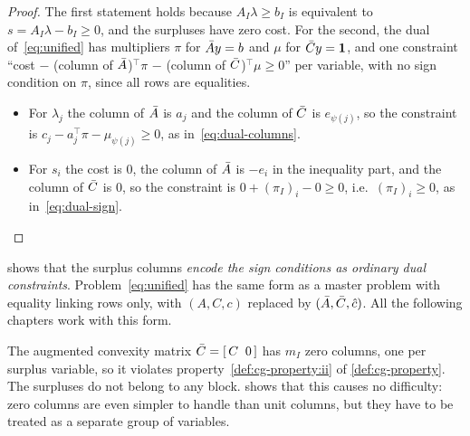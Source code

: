 \begin{proof}
The first statement holds because $A_I\lambda\ge b_I$ is equivalent to
$s = A_I\lambda - b_I\ge0$, and the surpluses have zero cost. For the second, the dual
of~\eqref{eq:unified} has multipliers $\pi$ for $\bar{A} y = b$ and $\mu$ for $\bar{C} y = \mathbf{1}$,
and one constraint ``cost $-$ (column of $\bar{A}$)$^\top\pi$ $-$ (column of $\bar{C}$)$^\top\mu\ge0$''
per variable, with no sign condition on $\pi$, since all rows are equalities.
\begin{itemize}
    \item For $\lambda_j$ the column of $\bar{A}$ is $a_j$ and the column of $\bar{C}$ is
          $e_{\psi(j)}$, so the constraint is $c_j - a_j^\top\pi - \mu_{\psi(j)}\ge0$, as
          in~\eqref{eq:dual-columns}.
    \item For $s_i$ the cost is $0$, the column of $\bar{A}$ is $-e_i$ in the inequality part, and
          the column of $\bar{C}$ is $0$, so the constraint is $0 + (\pi_I)_i - 0\ge0$, i.e.\
          $(\pi_I)_i\ge0$, as in~\eqref{eq:dual-sign}. \qedhere
\end{itemize}
\end{proof}

 shows that the surplus columns \emph{encode the sign conditions as
ordinary dual constraints}. Problem~\eqref{eq:unified} has the same form as a master problem
with equality linking rows only, with $(A, C, c)$ replaced by $(\bar{A},\bar{C},\hat{c})$. All the
following chapters work with this form.

\begin{remark} \label{rem:cg-property-lost}
The augmented convexity matrix $\bar{C} = [\,C\;\;0\,]$ has $m_I$ zero columns, one per
surplus variable, so it violates property~\ref{def:cg-property:ii} of \cref{def:cg-property}. The surpluses do
not belong to any block. \Cref{chap:qpas} shows that this causes no difficulty: zero
columns are even simpler to handle than unit columns, but they have to be treated as a
separate group of variables.
\end{remark}

